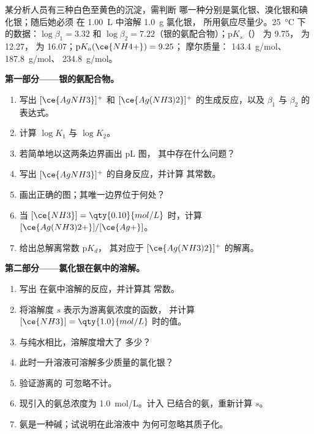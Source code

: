 \begin{problem}
\label{pb:b1:complexation:1}
某分析人员有三种白色至黄色的沉淀，需判断
哪一种分别是氯化银、溴化银和碘化银；随后她必须
在 \qty{1.00}{L} 中溶解 \qty{1.0}{g} 氯化银，
所用氨应尽量少。\qty{25}{\celsius} 下的数据：$\log\beta_1 = 3.32$ 和
$\log\beta_2 = 7.22$（银的氨配合物）；$\mathrm{p}K_s$（）
为 9.75， 为 12.27， 为 16.07；$\mathrm{p}K_a(\ce{NH4+}) = 9.25$；
摩尔质量： \qty{143.4}{g/mol}、 \qty{187.8}{g/mol}、
 \qty{234.8}{g/mol}。

\medskip
\noindent\textbf{第一部分——银的氨配合物。}
\begin{enumerate}
  \item 写出 $[\ce{AgNH3}]^{+}$ 和
        $[\ce{Ag(NH3)2}]^{+}$ 的生成反应，以及 $\beta_1$ 与 $\beta_2$ 的表达式。
  \item 计算 $\log K_1$ 与 $\log K_2$。
  \item 若简单地以这两条边界画出 pL 图，
        其中存在什么问题？
  \item 写出 $[\ce{AgNH3}]^{+}$ 的自身反应，并计算
        其常数。
  \item 画出正确的图；其唯一边界位于何处？
  \item 当 $[\ce{NH3}] = \qty{0.10}{mol/L}$ 时，计算
        $[\ce{Ag(NH3)2+}]/[\ce{Ag+}]$。
  \item 给出总解离常数 $\mathrm{p}K_d$，
        其对应于 $[\ce{Ag(NH3)2}]^{+}$ 的解离。
\end{enumerate}

\medskip
\noindent\textbf{第二部分——氯化银在氨中的溶解。}
\begin{enumerate}[resume]
  \item 写出  在氨中溶解的反应，并计算其
        常数。
  \item 将溶解度 $s$ 表示为游离氨浓度的函数，
        并计算 $[\ce{NH3}] = \qty{1.0}{mol/L}$ 时的值。
  \item 与纯水相比，溶解度增大了
        多少？
  \item 此时一升溶液可溶解多少质量的氯化银？
  \item 验证游离的  可忽略不计。
  \item 现引入的氨总浓度为 \qty{1.0}{mol/L}。计入
        已结合的氨，重新计算 $s$。
  \item 氨是一种碱；试说明在此溶液中
        为何可忽略其质子化。
\end{enumerate}


\end{problem}
